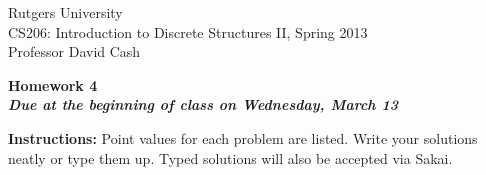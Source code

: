 \documentclass[11pt]{article}
\begin{document}
\sloppy

\noindent Rutgers University\\
CS206: Introduction to Discrete Structures II, Spring 2013\\
Professor David Cash\\

\begin{center}
\LARGE{\textbf{Homework 4}}\\
\large{\textbf{\emph{Due at the beginning of class on Wednesday, March 13}}}
\end{center}

\vspace{.1in}

\noindent\textbf{Instructions:} Point values for each problem are listed.
Write your solutions neatly or type them up.  Typed solutions will also be
accepted via Sakai.
\end{document}
